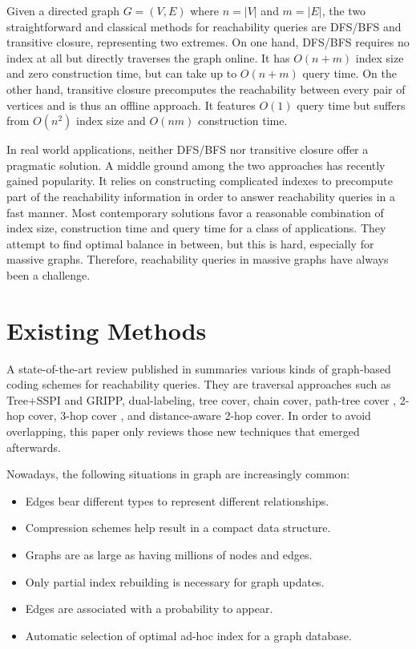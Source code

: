 \documentclass[12pt,conference,compsocconf]{../IEEEtran}
\begin{document}
Given a directed graph $G = (V, E)$ where $n = |V|$ and $m = |E|$, the two straightforward and classical methods for reachability queries are DFS/BFS and transitive closure, representing two extremes. On one hand, DFS/BFS requires no index at all but directly traverses the graph online. It has $O(n + m)$ index size and zero construction time, but can take up to $O(n + m)$ query time. On the other hand, transitive closure precomputes the reachability between every pair of vertices and is thus an offline approach. It features $O(1)$ query time but suffers from $O(n^2)$ index size and $O(nm)$ construction time.

In real world applications, neither DFS/BFS nor transitive closure offer a pragmatic solution. A middle ground among the two approaches has
recently gained popularity. It relies on constructing complicated indexes to precompute part of the reachability information in order to answer reachability queries in a fast manner. Most contemporary solutions favor a reasonable combination of index size, construction time and query time for a class of applications. They attempt to find optimal balance in between, but this is hard, especially for massive graphs. Therefore, reachability queries in massive graphs have always been a challenge.

\section{Existing Methods}

A state-of-the-art review published in \citeyear{1063} \citep{1063} summaries various kinds of graph-based coding schemes for reachability queries. They are traversal approaches such as Tree+SSPI and GRIPP, dual-labeling, tree cover, chain cover, path-tree cover \citep{1066}, 2-hop cover, 3-hop cover \citep{1067}, and distance-aware 2-hop cover. In order to avoid overlapping, this paper only reviews those new techniques that emerged afterwards. %

Nowadays, the following situations in graph are increasingly common:

\begin{itemize}
\item Edges bear different types to represent different relationships.
\item Compression schemes help result in a compact data structure.
\item Graphs are as large as having millions of nodes and edges.
\item Only partial index rebuilding is necessary for graph updates.
\item Edges are associated with a probability to appear.
\item Automatic selection of optimal ad-hoc index for a graph database.
\end{itemize}
\end{document}
